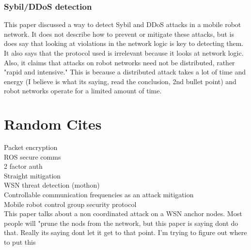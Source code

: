 \subsubsection{Sybil/DDoS detection}

This paper \cite{Basan2018} discussed a way to detect Sybil and DDoS attacks in a mobile robot network. It does not describe how to prevent or mitigate these attacks, but is does say that looking at violations in the network logic is key to detecting them. It also says that the protocol used is irrelevant because it looks at network logic. Also, it claims that attacks on robot networks need not be distributed, rather "rapid and intensive." This is because a distributed attack takes a lot of time and energy (I believe is what its saying, read the conclusion, 2nd bullet point) and robot networks operate for a limited amount of time.

\section{Random Cites}

Packet encryption\cite{ALAZZAM20188}\\ %
ROS secure comms \cite{inproceedings:Breiling}\\ %
2 factor auth \cite{Miglani2FA}\\ %
Straight mitigation \cite{inbook:Priyadarshini}\\ %
WSN threat detection (mothon) \cite{Lasota2016}\\
Controllable communication frequencies as an attack mitigation \cite{Park2018}\\
Mobile robot control group security protocol \cite{Basan:2017}\\


This paper talks about a non coordinated attack on a WSN anchor nodes. Most people will "prune the nods from the network, but this paper is saying dont do that. Really its saying dont let it get to that point. I'm trying to figure out where to put this \cite{Mofarreh-Bonab2012} %


